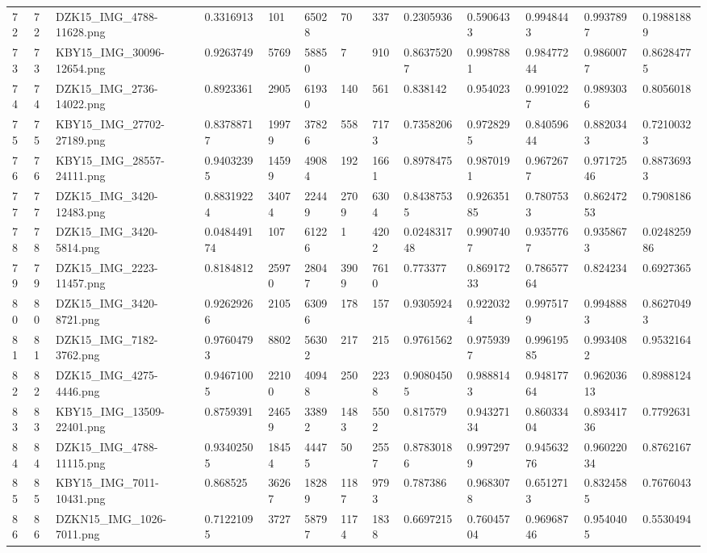 \documentclass[11pt, a4paper, twoside]{report}
\begin{document}
\begin{longtable}[c]{@{}lllllllllllll@{}}
72 & 72 & DZK15\_IMG\_4788-11628.png & 0.3316913 & 101 & 65028 & 70 & 337 & 0.2305936 & 0.5906433 & 0.9948443 & 0.9937897 & 0.19881889 \\
73 & 73 & KBY15\_IMG\_30096-12654.png & 0.9263749 & 5769 & 58850 & 7 & 910 & 0.86375207 & 0.9987881 & 0.98477244 & 0.9860077 & 0.86284775 \\
74 & 74 & DZK15\_IMG\_2736-14022.png & 0.8923361 & 2905 & 61930 & 140 & 561 & 0.838142 & 0.954023 & 0.9910227 & 0.9893036 & 0.8056018 \\
75 & 75 & KBY15\_IMG\_27702-27189.png & 0.83788717 & 19979 & 37826 & 558 & 7173 & 0.7358206 & 0.9728295 & 0.84059644 & 0.8820343 & 0.72100323 \\
76 & 76 & KBY15\_IMG\_28557-24111.png & 0.94032395 & 14599 & 49084 & 192 & 1661 & 0.8978475 & 0.9870191 & 0.9672677 & 0.97172546 & 0.88736933 \\
77 & 77 & DZK15\_IMG\_3420-12483.png & 0.88319224 & 34074 & 22449 & 2709 & 6304 & 0.84387535 & 0.92635185 & 0.7807533 & 0.86247253 & 0.7908186 \\
78 & 78 & DZK15\_IMG\_3420-5814.png & 0.048449174 & 107 & 61226 & 1 & 4202 & 0.024831748 & 0.9907407 & 0.9357767 & 0.9358673 & 0.024825986 \\
79 & 79 & DZK15\_IMG\_2223-11457.png & 0.8184812 & 25970 & 28047 & 3909 & 7610 & 0.773377 & 0.86917233 & 0.78657764 & 0.824234 & 0.6927365 \\
80 & 80 & DZK15\_IMG\_3420-8721.png & 0.92629266 & 2105 & 63096 & 178 & 157 & 0.9305924 & 0.9220324 & 0.9975179 & 0.9948883 & 0.86270493 \\
81 & 81 & DZK15\_IMG\_7182-3762.png & 0.97604793 & 8802 & 56302 & 217 & 215 & 0.9761562 & 0.9759397 & 0.99619585 & 0.9934082 & 0.9532164 \\
82 & 82 & DZK15\_IMG\_4275-4446.png & 0.94671005 & 22100 & 40948 & 250 & 2238 & 0.90804505 & 0.9888143 & 0.94817764 & 0.96203613 & 0.8988124 \\
83 & 83 & KBY15\_IMG\_13509-22401.png & 0.8759391 & 24659 & 33892 & 1483 & 5502 & 0.817579 & 0.94327134 & 0.86033404 & 0.89341736 & 0.7792631 \\
84 & 84 & DZK15\_IMG\_4788-11115.png & 0.93402505 & 18454 & 44475 & 50 & 2557 & 0.87830186 & 0.9972979 & 0.94563276 & 0.96022034 & 0.8762167 \\
85 & 85 & KBY15\_IMG\_7011-10431.png & 0.868525 & 36267 & 18289 & 1187 & 9793 & 0.787386 & 0.9683078 & 0.6512713 & 0.8324585 & 0.7676043 \\
86 & 86 & DZKN15\_IMG\_1026-7011.png & 0.71221095 & 3727 & 58797 & 1174 & 1838 & 0.6697215 & 0.76045704 & 0.96968746 & 0.9540405 & 0.5530494 \\

\end{longtable}
\end{document}

